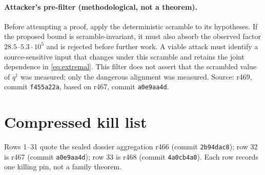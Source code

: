 \documentclass[11pt]{article}
\begin{document}
\paragraph{Attacker's pre-filter (methodological, not a theorem).}
Before attempting a proof, apply the deterministic scramble to its
hypotheses.  If the proposed bound is scramble-invariant, it must
also absorb the observed factor $28.5$--$5.3\cdot10^5$ and is
rejected before further work.  A viable attack must identify a
source-sensitive input that changes under this scramble and retains
the joint dependence in \eqref{eq:extremal}.  This filter does not
assert that the scrambled value of $q^\dagger$ was measured; only
the dangerous alignment was measured.  Source: r469, commit
\texttt{f455a22a}, based on r467, commit \texttt{a0e9aa4d}.

\section{Compressed kill list}\label{sec:kills}

Rows 1--31 quote the sealed dossier aggregation r466
(commit \texttt{2b94dac8}); row 32 is r467
(commit \texttt{a0e9aa4d}); row 33 is r468
(commit \texttt{4a0cb4a0}).  Each row records one killing pin, not a
family theorem.
\end{document}
